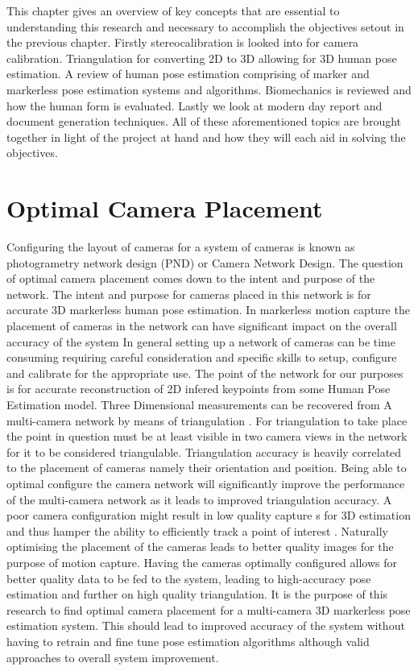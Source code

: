 \label{chap:literaturereview}

This chapter gives an overview of key concepts that are essential to understanding this research and necessary to accomplish the objectives setout in the previous chapter. Firstly stereocalibration is looked into for camera calibration. Triangulation for converting 2D to 3D allowing for 3D human pose estimation. A review of human pose estimation comprising of marker and markerless pose estimation systems and algorithms. Biomechanics is reviewed and how the human form is evaluated. Lastly we look at modern day report and document generation techniques.
All of these aforementioned topics are brought together in light of the project at hand and how they will each aid in solving the objectives.

\section{Optimal Camera Placement}

Configuring the layout of cameras for a system of cameras is known as photogrametry network design (PND) or Camera Network Design. The question of optimal camera placement comes down to the intent and purpose of the network. 
The intent and purpose for cameras placed in this network is for accurate 3D markerless human pose estimation. 
In markerless motion capture the placement of cameras in the network can have significant impact on the overall accuracy of the system \cite{brown2022where}
In general setting up a network of cameras can be time consuming requiring careful consideration and specific skills to setup, configure and calibrate for the appropriate use. 
The point of the network for our purposes is for accurate reconstruction of 2D infered keypoints from some Human Pose Estimation model. Three Dimensional measurements can be recovered from A
multi-camera network by means of triangulation \cite{olague2001applications-f89, rahimian2016optimal}. For triangulation to take place the point in question must be at least 
visible in two camera views in the network for it to be considered triangulable. Triangulation accuracy is heavily correlated to the placement of cameras namely their orientation and position.
Being able to optimal configure the camera network will significantly improve the performance of the multi-camera network as it leads to improved triangulation accuracy.
A poor camera configuration might result in low quality capture s for 3D estimation and thus hamper the ability to efficiently track a point of interest \cite{rahimian2016optimal}.
Naturally optimising the placement of the cameras leads to better quality images for the purpose of motion capture. Having the cameras optimally configured allows for better quality
data to be fed to the system, leading to high-accuracy pose estimation and further on high quality triangulation.
It is the purpose of this research to find optimal camera placement for a multi-camera 3D markerless pose estimation system. This should lead to improved accuracy of the system
without having to retrain and fine tune pose estimation algorithms although valid approaches to overall system improvement.


